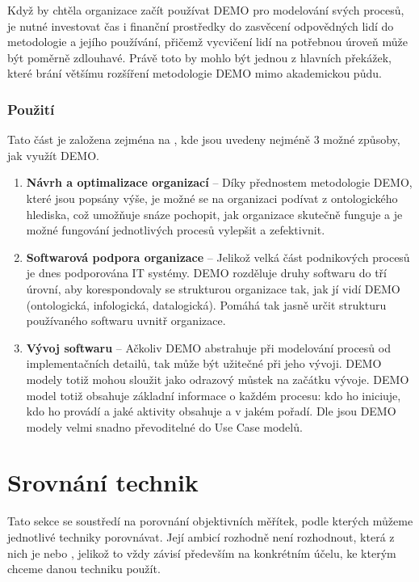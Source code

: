 \documentclass[]{article}
\begin{document}
Když by chtěla organizace začít používat DEMO pro modelování svých procesů, je nutné investovat čas i finanční prostředky do zasvěcení odpovědných lidí do metodologie a jejího používání, přičemž vycvičení lidí na potřebnou úroveň může být poměrně zdlouhavé. Právě toto by mohlo být jednou z hlavních překážek, které brání většímu rozšíření metodologie DEMO mimo akademickou půdu.

\subsubsection{Použití}
Tato část je založena zejména na \cite{Vejrazkova2012}, kde jsou uvedeny nejméně 3 možné způsoby, jak využít DEMO.

\begin{enumerate}
\item \textbf{Návrh a optimalizace organizací} – Díky přednostem metodologie DEMO, které jsou popsány výše, je možné se na organizaci podívat z ontologického hlediska, což umožňuje snáze pochopit, jak organizace skutečně funguje a je možné fungování jednotlivých procesů vylepšit a zefektivnit.
\item \textbf{Softwarová podpora organizace} – Jelikož velká část podnikových procesů je dnes podporována IT systémy. DEMO rozděluje druhy softwaru do tří úrovní, aby korespondovaly se strukturou organizace tak, jak jí vidí DEMO (ontologická, infologická, datalogická). Pomáhá tak jasně určit strukturu používaného softwaru uvnitř organizace. %
\item \textbf{Vývoj softwaru} – Ačkoliv DEMO abstrahuje při modelování procesů od implementačních detailů, tak může být užitečné při jeho vývoji. DEMO modely totiž mohou sloužit jako odrazový můstek na začátku vývoje. DEMO model totiž obsahuje základní informace o každém procesu: kdo ho iniciuje, kdo ho provádí a jaké aktivity obsahuje a v jakém pořadí. Dle \cite{Shishkov2005} jsou DEMO modely velmi snadno převoditelné do Use Case modelů.
\end{enumerate}


\section{Srovnání technik}
Tato sekce se soustředí na porovnání objektivních měřítek, podle kterých můžeme jednotlivé techniky porovnávat. Její ambicí rozhodně není rozhodnout, která z nich je  nebo , jelikož to vždy závisí především na konkrétním účelu, ke kterým chceme danou techniku použít.

\nocite{*}


\end{document}
